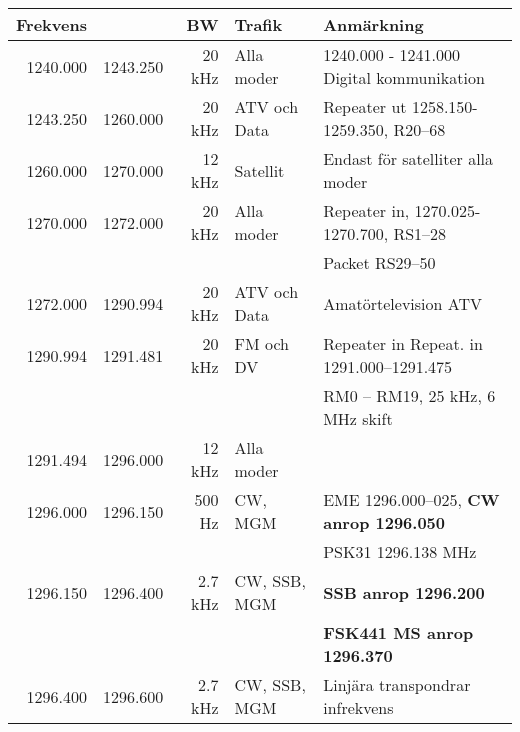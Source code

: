 \begin{tabular}{rrrll}
	\textbf{Frekvens}         &               & \textbf{BW} & \textbf{Trafik} & \textbf{Anmärkning}                                          \\ \hline
	1240.000         & 1243.250      & 20 kHz      & Alla moder      & 1240.000 - 1241.000 Digital kommunikation                    \\ \hline
	1243.250         & 1260.000      & 20 kHz      & ATV och Data    & Repeater ut 1258.150-1259.350, R20--68                       \\ \hline
	1260.000         & 1270.000      & 12 kHz      & Satellit        & Endast för satelliter alla moder                             \\ \hline
	1270.000         & 1272.000      & 20 kHz      & Alla moder      & Repeater in, 1270.025-1270.700, RS1--28                      \\
	&               &             &                 & Packet RS29--50                                              \\ \hline
	1272.000         & 1290.994      & 20 kHz      & ATV och Data    & Amatörtelevision ATV                                         \\ \hline
	1290.994         & 1291.481      & 20 kHz      & FM och DV       & Repeater in Repeat. in 1291.000--1291.475                    \\
	&               &             &                 & RM0 – RM19, 25 kHz, 6 MHz skift                              \\ \hline
	1291.494         & 1296.000      & 12 kHz      & Alla moder      &                                                              \\ \hline
	1296.000         & 1296.150      & 500 Hz      & CW,  MGM        & EME 1296.000--025, \textbf{CW anrop 1296.050}                \\
	&               &             &                 & PSK31 1296.138 MHz                                           \\ \hline
	1296.150         & 1296.400      & 2.7 kHz     & CW, SSB, MGM    & \textbf{SSB anrop 1296.200}                                  \\
	&               &             &                 & \textbf{FSK441 MS anrop 1296.370}                            \\ \hline
	1296.400         & 1296.600      & 2.7 kHz     & CW, SSB, MGM    & Linjära transpondrar infrekvens                              \\ \hline

\end{tabular}
